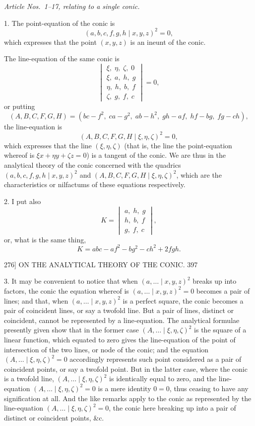 \documentclass[11pt]{article}
\begin{document}
\medskip
\centerline{\textit{Article Nos.~1--17, relating to a single conic.}}
\medskip

\textsc{1.} The point-equation of the conic is
\[ (a,b,c,f,g,h \mid x,y,z)^{2}=0, \]
which expresses that the point $(x,y,z)$ is an ineunt of the conic.

The line-equation of the same conic is
\[
\begin{vmatrix}
\xi,\;\eta,\;\zeta,\;0\\
\xi,\;a,\;h,\;g\\
\eta,\;h,\;b,\;f\\
\zeta,\;g,\;f,\;c
\end{vmatrix}=0,
\]
or putting
\[ (A,B,C,F,G,H)=(bc-f^{2},\;ca-g^{2},\;ab-h^{2},\;gh-af,\;hf-bg,\;fg-ch), \]
the line-equation is
\[ (A,B,C,F,G,H \mid \xi,\eta,\zeta)^{2}=0, \]
which expresses that the line $(\xi,\eta,\zeta)$ (that is, the line the point-equation whereof is
$\xi x+\eta y+\zeta z=0$) is a tangent of the conic. We are thus in the analytical theory of the
conic concerned with the quadrics $(a,b,c,f,g,h \mid x,y,z)^{2}$ and $(A,B,C,F,G,H \mid \xi,\eta,\zeta)^{2}$,
which are the characteristics or nilfactums of these equations respectively.

\textsc{2.} I put also
\[ K=
\begin{vmatrix}
a,\;h,\;g\\
h,\;b,\;f\\
g,\;f,\;c
\end{vmatrix},
\]
or, what is the same thing,
\[ K=abc-af^{2}-bg^{2}-ch^{2}+2fgh. \]

\begin{center}
\textsc{276]} \hfill ON THE ANALYTICAL THEORY OF THE CONIC. \hfill 397
\end{center}

\textsc{3.} It may be convenient to notice that when $(a,\dots \mid x,y,z)^{2}$ breaks up into factors,
the conic the equation whereof is $(a,\dots \mid x,y,z)^{2}=0$ becomes a pair of lines; and that,
when $(a,\dots \mid x,y,z)^{2}$ is a perfect square, the conic becomes a pair of coincident lines,
or say a twofold line. But a pair of lines, distinct or coincident, cannot be represented
by a line-equation. The analytical formulae presently given show that in the former
case $(A,\dots \mid \xi,\eta,\zeta)^{2}$ is the square of a linear function, which equated to zero gives the
line-equation of the point of intersection of the two lines, or node of the conic; and
the equation $(A,\dots \mid \xi,\eta,\zeta)^{2}=0$ accordingly represents such point considered as a pair
of coincident points, or say a twofold point. But in the latter case, where the conic
is a twofold line, $(A,\dots \mid \xi,\eta,\zeta)^{2}$ is identically equal to zero, and the line-equation
$(A,\dots \mid \xi,\eta,\zeta)^{2}=0$ is a mere identity $0=0$, thus ceasing to have any signification at
all. And the like remarks apply to the conic as represented by the line-equation
$(A,\dots \mid \xi,\eta,\zeta)^{2}=0$, the conic here breaking up into a pair of distinct or coincident
points, \&c.
\end{document}
